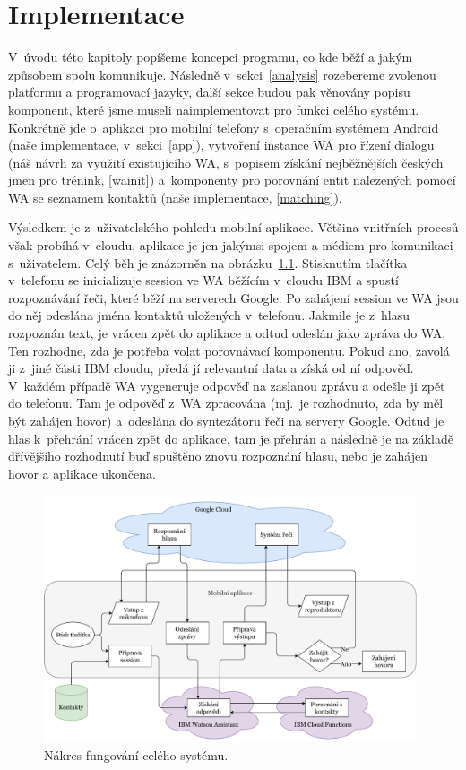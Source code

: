 \chapter{Implementace}\label{chapter-implementation}

V~úvodu této kapitoly popíšeme koncepci programu, co kde
běží a jakým způsobem spolu komunikuje. Následně v~sekci~\ref{analysis}
rozebereme zvolenou platformu a programovací jazyky,
další sekce budou pak věnovány popisu komponent, které jsme museli
naimplementovat pro funkci celého systému. Konkrétně jde o~aplikaci pro
mobilní telefony s~operačním systémem Android (naše implementace,
v~sekci~\ref{app}), vytvoření instance WA pro řízení
dialogu (náš návrh za využití existujícího WA,
s~popisem získání nejběžnějších českých jmen pro trénink, \ref{wainit}) a~komponenty
pro porovnání entit nalezených pomocí WA se seznamem kontaktů (naše implementace,
\ref{matching}).

Výsledkem je z~uživatelského pohledu mobilní
aplikace. Většina vnitřních procesů však probíhá v~cloudu, aplikace
je jen jakýmsi spojem a médiem pro komunikaci s~uživatelem. Celý běh
je znázorněn na obrázku~\ref{img-flowchart}. Stisknutím tlačítka
v~telefonu se
inicializuje session ve WA běžícím v~cloudu IBM a spustí rozpoznávání řeči,
které běží na serverech Google. Po zahájení session ve WA jsou do něj
odeslána jména kontaktů uložených v~telefonu. Jakmile je z~hlasu rozpoznán
text, je vrácen zpět do aplikace a odtud odeslán jako zpráva do WA.
Ten rozhodne, zda je potřeba volat
porovnávací komponentu. Pokud ano, zavolá ji z~jiné části IBM cloudu,
předá jí relevantní data a získá od ní odpověď. V~každém případě
WA vygeneruje odpověď na zaslanou zprávu a odešle ji zpět do telefonu.
Tam je odpověď z~WA zpracována (mj.\ je rozhodnuto, zda by měl být
zahájen hovor) a~odeslána do syntezátoru řeči na servery Google.
Odtud je hlas k~přehrání vrácen zpět do aplikace, tam je přehrán
a následně je na základě dřívějšího rozhodnutí buď spuštěno znovu
rozpoznání hlasu, nebo je zahájen hovor a aplikace ukončena.

\begin{figure}[h]
    \centering
    \includegraphics[width=0.98\textwidth]{../img/app-flowchart.pdf}
    \caption{Nákres fungování celého systému.}\label{img-flowchart}
\end{figure}

